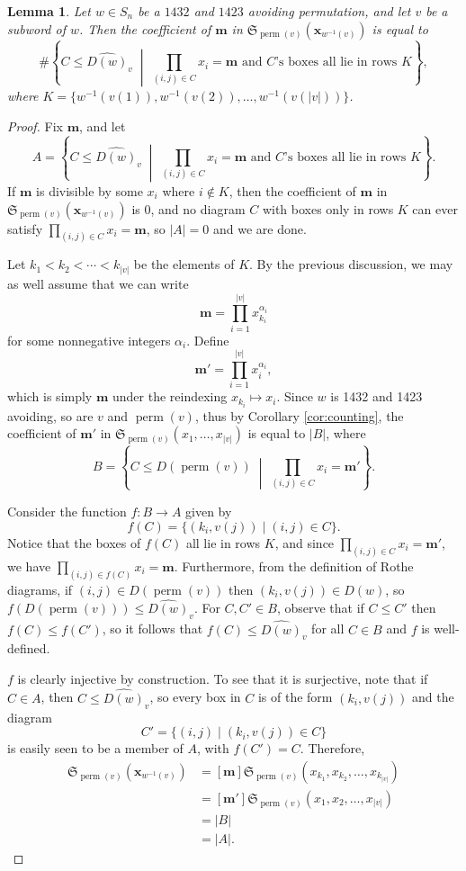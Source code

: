 \documentclass{amsart}
\newtheorem{lemma}[theorem]{Lemma}
\theoremstyle{definition}
\theoremstyle{named}
\newcommand*{\Schub}{\mathfrak{S}}
\DeclareMathOperator*{\perm}{perm}
\begin{document}
\begin{lemma}
\label{lem:counting}
Let $w \in S_n$ be a $1432$ and $1423$ avoiding permutation, and let $v$ be a subword of $w$. Then the coefficient of $\mathbf{m}$ in $\Schub_{\perm(v)}(\mathbf{x}_{w^{-1}(v)})$ is equal to
\[
\# \left\{ C \le \widehat{D(w)}_v \;\middle|\; \prod_{(i, j) \in C} x_i = \mathbf{m} \text{ and $C$'s boxes all lie in rows $K$} \right\},
\]
where $K = \{ w^{-1}(v(1)), w^{-1}(v(2)), \dots, w^{-1}(v(\left|v\right|)) \}$.
\end{lemma}
\begin{proof}
Fix $\mathbf{m}$, and let
\[
A = \left\{ C \le \widehat{D(w)}_v \;\middle|\; \prod_{(i, j) \in C} x_i = \mathbf{m} \text{ and $C$'s boxes all lie in rows $K$} \right\}.
\]
If $\mathbf{m}$ is divisible by some $x_i$ where $i \notin K$, then the coefficient of $\mathbf{m}$ in $\Schub_{\perm(v)}(\mathbf{x}_{w^{-1}(v)})$ is $0$, and no diagram $C$ with boxes only in rows $K$ can ever satisfy $\prod_{(i, j) \in C} x_i = \mathbf{m}$, so $\left|A\right| = 0$ and we are done.

Let $k_1 < k_2 < \cdots < k_{\left|v\right|}$ be the elements of $K$. By the previous discussion, we may as well assume that we can write
\[
\mathbf{m} = \prod_{i = 1}^{\left|v\right|} x_{k_i}^{\alpha_i}
\]
for some nonnegative integers $\alpha_i$. Define
\[
\mathbf{m}' = \prod_{i = 1}^{\left|v\right|} x_i^{\alpha_i},
\]
which is simply $\mathbf{m}$ under the reindexing $x_{k_i} \mapsto x_i$. Since $w$ is 1432 and 1423 avoiding, so are $v$ and $\perm(v)$, thus by Corollary \ref{cor:counting}, the coefficient of $\mathbf{m'}$ in $\Schub_{\perm(v)}(x_1, \dots, x_{\left|v\right|})$ is equal to $\left|B\right|$, where
\[
B = \left\{ C \le D(\perm(v)) \;\middle|\; \prod_{(i, j) \in C} x_i = \mathbf{m'} \right\}.
\]

Consider the function $f \colon B \to A$ given by
\[
f(C) = \{ (k_i, v(j)) \mid (i, j) \in C \}.
\]
Notice that the boxes of $f(C)$ all lie in rows $K$, and since $\prod_{(i, j) \in C} x_i = \mathbf{m'}$, we have $\prod_{(i, j) \in f(C)} x_i = \mathbf{m}$. Furthermore, from the definition of Rothe diagrams, if $(i, j) \in D(\perm(v))$ then $(k_i, v(j)) \in D(w)$, so $f(D(\perm(v))) \le \widehat{D(w)}_v$. For $C, C' \in B$, observe that if $C \le C'$ then $f(C) \le f(C')$, so it follows that $f(C) \le \widehat{D(w)}_v$ for all $C \in B$ and $f$ is well-defined.

$f$ is clearly injective by construction. To see that it is surjective, note that if $C \in A$, then $C \le \widehat{D(w)}_v$, so every box in $C$ is of the form $(k_i, v(j))$ and the diagram
\[
C' = \{ (i, j) \mid (k_i, v(j)) \in C \}
\]
is easily seen to be a member of $A$, with $f(C') = C$. Therefore,
\begin{align*}
[\mathbf{m}] \Schub_{\perm(v)}(\mathbf{x}_{w^{-1}(v)}) &= [\mathbf{m}] \Schub_{\perm(v)}(x_{k_1}, x_{k_2}, \dots, x_{k_{\left|v\right|}}) \\
&= [\mathbf{m'}] \Schub_{\perm(v)}(x_1, x_2, \dots, x_{\left|v\right|}) \\
&= \left|B\right| \\
&= \left|A\right|.
\end{align*}
\end{proof}
\end{document}
